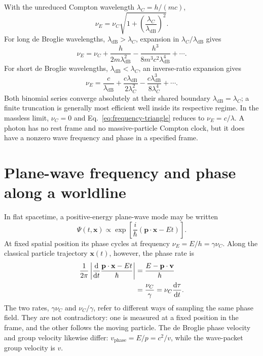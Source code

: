 \documentclass[12pt]{article}
\begin{document}
With the unreduced Compton wavelength $\lambda_C=h/(mc)$,
\begin{equation}
  \nu_E=\nu_C\sqrt{1+\left(\frac{\lambda_C}{\lambda_{\mathrm{dB}}}\right)^2}.
  \label{eq:wavelength-frequency}
\end{equation}
For long de Broglie wavelengths, $\lambda_{\mathrm{dB}}>\lambda_C$, expansion in $\lambda_C/\lambda_{\mathrm{dB}}$ gives
\begin{equation}
  \nu_E=\nu_C+\frac{h}{2m\lambda_{\mathrm{dB}}^2}
    -\frac{h^3}{8m^3c^2\lambda_{\mathrm{dB}}^4}+\cdots.
  \label{eq:long-wavelength-series}
\end{equation}
For short de Broglie wavelengths, $\lambda_{\mathrm{dB}}<\lambda_C$, an inverse-ratio expansion gives
\begin{equation}
  \nu_E=\frac{c}{\lambda_{\mathrm{dB}}}
    +\frac{c\lambda_{\mathrm{dB}}}{2\lambda_C^2}
    -\frac{c\lambda_{\mathrm{dB}}^3}{8\lambda_C^4}+\cdots.
  \label{eq:short-wavelength-series}
\end{equation}
Both binomial series converge absolutely at their shared boundary $\lambda_{\mathrm{dB}}=\lambda_C$; a finite truncation is generally most efficient well inside its respective regime. In the massless limit, $\nu_C=0$ and Eq.~\eqref{eq:frequency-triangle} reduces to $\nu_E=c/\lambda$. A photon has no rest frame and no massive-particle Compton clock, but it does have a nonzero wave frequency and phase in a specified frame.

\section{Plane-wave frequency and phase along a worldline}

In flat spacetime, a positive-energy plane-wave mode may be written
\begin{equation}
  \Psi(t,\mathbf{x})\propto
  \exp\!\left[\frac{i}{\hbar}\left(\mathbf{p}\cdot\mathbf{x}-Et\right)\right].
  \label{eq:plane-wave}
\end{equation}
At fixed spatial position its phase cycles at frequency $\nu_E=E/h=\gamma\nu_C$. Along the classical particle trajectory $\mathbf{x}(t)$, however, the phase rate is
\begin{align}
  \frac{1}{2\pi}\left|\frac{\mathrm{d}}{\mathrm{d}t}
    \frac{\mathbf{p}\cdot\mathbf{x}-Et}{\hbar}\right|
  &=\frac{E-\mathbf{p}\cdot\mathbf{v}}{h} \notag\\
  &=\frac{\nu_C}{\gamma}
   =\nu_C\frac{\mathrm{d}\tau}{\mathrm{d}t}.
  \label{eq:path-phase-rate}
\end{align}
The two rates, $\gamma\nu_C$ and $\nu_C/\gamma$, refer to different ways of sampling the same phase field. They are not contradictory: one is measured at a fixed position in the frame, and the other follows the moving particle. The de Broglie phase velocity and group velocity likewise differ: $v_{\mathrm{phase}}=E/p=c^2/v$, while the wave-packet group velocity is $v$.
\end{document}
